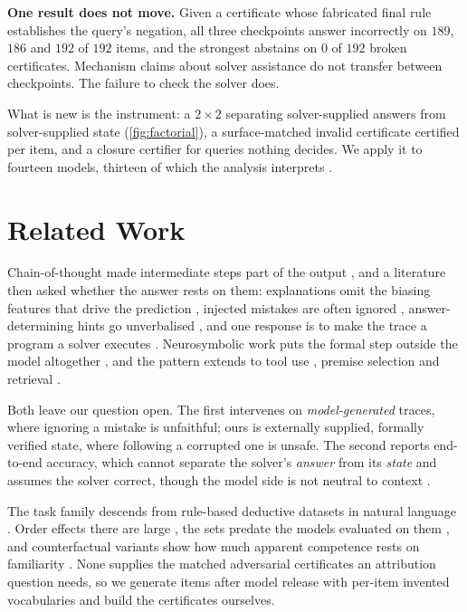 \documentclass{article}
\begin{document}
\textbf{One result does not move.} Given a certificate whose fabricated final
rule establishes the query's negation, all three checkpoints answer incorrectly
on $189$, $186$ and $192$ of $192$ items, and the strongest abstains on $0$ of
$192$ broken certificates.
Mechanism claims about solver assistance do not transfer between checkpoints.
The failure to check the solver does.

What is new is the instrument: a $2\times2$ separating solver-supplied answers
from solver-supplied state (\cref{fig:factorial}), a surface-matched invalid
certificate certified per item, and a closure certifier for queries nothing
decides. We apply it to fourteen models, thirteen of which the analysis interprets
\citep{team2024qwen,yang2025qwen3,grattafiori2024llama,team2025gemma,microsoft2025phi,team2024olmo,allal2025smollm}.

\section{Related Work}

Chain-of-thought made intermediate steps part of the output
\citep{wei2022chainofthought}, and a literature then asked whether the answer
rests on them: explanations omit the biasing features that drive the prediction
\citep{turpin2023language}, injected mistakes are often ignored
\citep{lanham2023measuring,arcuschin2025chainofthought}, answer-determining
hints go unverbalised \citep{chen2025reasoning}, and one response is to make the
trace a program a solver executes \citep{lyu2023faithful}. Neurosymbolic work
puts the formal step outside the model altogether
\citep{pan2023logiclm,olausson2023linc,ye2023satlm,gao2022pal}, and the pattern
extends to tool use \citep{schick2023toolformer}, premise selection
\citep{yang2023leandojo} and retrieval \citep{lewis2020retrievalaugmented}.

Both leave our question open. The first intervenes on \emph{model-generated}
traces, where ignoring a mistake is unfaithful; ours is externally supplied,
formally verified state, where following a corrupted one is unsafe. The second
reports end-to-end accuracy, which cannot separate the solver's \emph{answer}
from its \emph{state} and assumes the solver correct, though the model side is
not neutral to context \citep{shi2023large,xie2023adaptive}.

The task family descends from rule-based deductive datasets in natural language
\citep{clark2020transformers,tafjord2020proofwriter,saparov2022language,han2022folio}.
Order effects there are large \citep{chen2024premise}, the sets predate the
models evaluated on them \citep{deng2024investigating,golchin2023time}, and
counterfactual variants show how much apparent competence rests on familiarity
\citep{wu2023reasoning}. None supplies the matched adversarial certificates an
attribution question needs, so we generate items after model release with
per-item invented vocabularies and build the certificates ourselves.
\end{document}
